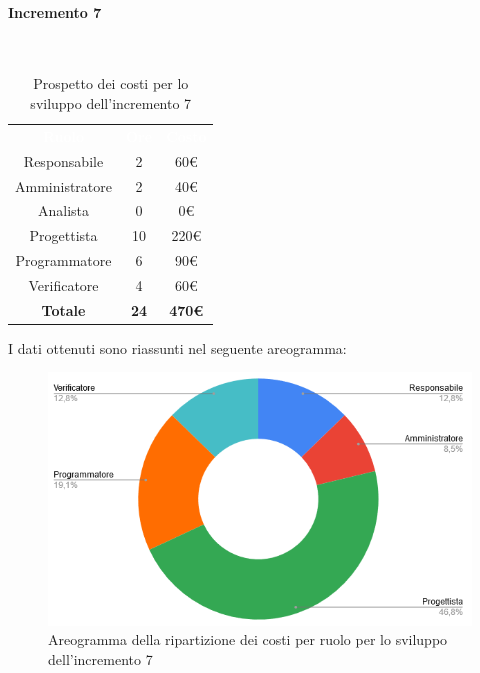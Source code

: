\paragraph*{Incremento 7}\mbox{} \\
\begin{table}[H]
\centering\renewcommand{\arraystretch}{1.5}
\caption{Prospetto dei costi per lo sviluppo dell'incremento 7}
\vspace{0.2cm}
\begin{tabular}{ c c c }
\rowcolor{redafk}
\textcolor{white}{\textbf{Ruolo}} & \textcolor{white}{\textbf{Ore}} &
\textcolor{white}{\textbf{Costo}}  \\
Responsabile & 2 & 60€ \\
Amministratore & 2 & 40€ \\
Analista & 0 & 0€ \\
Progettista & 10 & 220€ \\
Programmatore & 6 & 90€  \\
Verificatore & 4 & 60€  \\
\rowcolor{lastrowcolor}
\textbf{Totale} & \textbf{24} & \textbf{470€}  \\
\end{tabular}
\end{table}
 
I dati ottenuti sono riassunti nel seguente areogramma:
\begin{figure}[H]
\centering
\includegraphics[scale=0.60]{img/grafici/torta_inc7.png}
\caption{Areogramma della ripartizione dei costi per ruolo per lo sviluppo dell'incremento 7}
\end{figure}

